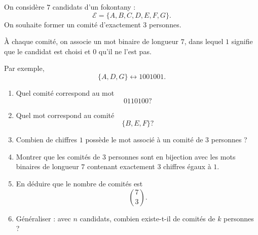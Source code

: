 On considère $7$ candidats d'un fokontany :
\[
\mathcal{E} = \{A, B, C, D, E, F, G\}.
\]
On souhaite former un comité d'exactement $3$ personnes.

À chaque comité, on associe un mot binaire de longueur $7$, dans lequel $1$
signifie que le candidat est choisi et $0$ qu'il ne l'est pas.

Par exemple,
\[
\{A, D, G\} \longleftrightarrow 1001001.
\]
\begin{enumerate}
  \item Quel comité correspond au mot
  \[
  0110100 ?
  \]
  \item Quel mot correspond au comité
  \[
  \{B, E, F\} ?
  \]
  \item Combien de chiffres $1$ possède le mot associé à un comité de $3$
  personnes ?
  \item Montrer que les comités de $3$ personnes sont en bijection avec les
  mots binaires de longueur $7$ contenant exactement $3$ chiffres égaux à $1$.
  \item En déduire que le nombre de comités est
  \[
  \binom{7}{3}.
  \]
  \item Généraliser : avec $n$ candidats, combien existe-t-il de comités de
  $k$ personnes ?
\end{enumerate}
